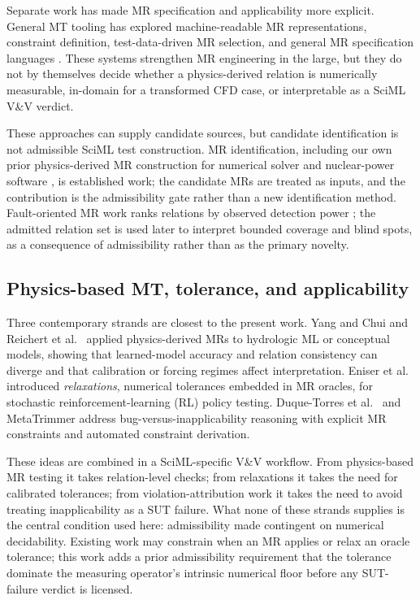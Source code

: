 \documentclass[preprint,12pt]{elsarticle}
\begin{document}
Separate work has made MR specification and applicability more explicit. General MT tooling has explored machine-readable MR representations, constraint definition, test-data-driven MR selection, and general MR specification languages \citep{duqueTorres2023completePipeline,duqueTorres2024selecting,sun2026ccml}. These systems strengthen MR engineering in the large, but they do not by themselves decide whether a physics-derived relation is numerically measurable, in-domain for a transformed CFD case, or interpretable as a SciML V\&V verdict.

These approaches can supply candidate sources, but candidate identification is not admissible SciML test construction. MR identification, including our own prior physics-derived MR construction for numerical solver and nuclear-power software \citep{li2022nuclearmr,wang2022mridentification}, is established work; the candidate MRs are treated as inputs, and the contribution is the admissibility gate rather than a new identification method. Fault-oriented MR work ranks relations by observed detection power \citep{srinivasan2022prioritization,saha2019faultdetection}; the admitted relation set is used later to interpret bounded coverage and blind spots, as a consequence of admissibility rather than as the primary novelty.

\subsection{Physics-based MT, tolerance, and applicability}
\label{subsec:physics-mt}

Three contemporary strands are closest to the present work. Yang and Chui \citep{yang2021hydromt} and Reichert et al.~\citep{reichert2024hess} applied physics-derived MRs to hydrologic ML or conceptual models, showing that learned-model accuracy and relation consistency can diverge and that calibration or forcing regimes affect interpretation. Eniser et al.~\citep{eniser2022relaxations} introduced \emph{relaxations}, numerical tolerances embedded in MR oracles, for stochastic reinforcement-learning (RL) policy testing. Duque-Torres et al.~\citep{duqueTorres2023bugornot,duqueTorres2023completePipeline,duqueTorres2024selecting} and MetaTrimmer \citep{duqueTorres2023metaTrimmer} address bug-versus-inapplicability reasoning with explicit MR constraints and automated constraint derivation.

These ideas are combined in a SciML-specific V\&V workflow. From physics-based MR testing it takes relation-level checks; from relaxations it takes the need for calibrated tolerances; from violation-attribution work it takes the need to avoid treating inapplicability as a SUT failure. What none of these strands supplies is the central condition used here: admissibility made contingent on numerical decidability. Existing work may constrain when an MR applies or relax an oracle tolerance; this work adds a prior admissibility requirement that the tolerance dominate the measuring operator's intrinsic numerical floor before any SUT-failure verdict is licensed.
\end{document}
